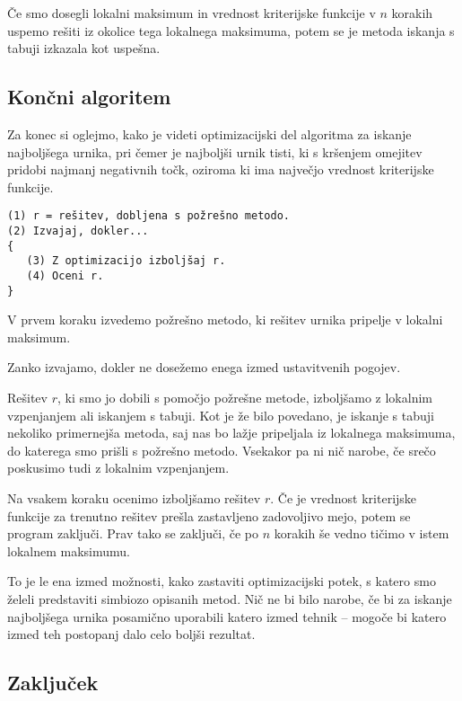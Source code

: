 \documentclass[a4paper, 10pt]{article}
\begin{document}
Če smo dosegli lokalni maksimum in vrednost kriterijske funkcije v $n$ korakih uspemo
rešiti iz okolice tega lokalnega maksimuma, potem se je metoda iskanja s tabuji izkazala
kot uspešna.

\subsection{Končni algoritem}

Za konec si oglejmo, kako je videti optimizacijski del algoritma za iskanje najboljšega
urnika, pri čemer je najboljši urnik tisti, ki s kršenjem omejitev pridobi najmanj negativnih
točk, oziroma ki ima največjo vrednost kriterijske funkcije.

\begin{verbatim}
(1) r = rešitev, dobljena s požrešno metodo.
(2) Izvajaj, dokler...
{
   (3) Z optimizacijo izboljšaj r.
   (4) Oceni r.
}
\end{verbatim}

   V prvem koraku izvedemo požrešno metodo, ki rešitev urnika pripelje v lokalni maksimum.

   Zanko izvajamo, dokler ne dosežemo enega izmed ustavitvenih pogojev.

   Rešitev $r$, ki smo jo dobili s pomočjo požrešne metode, izboljšamo z lokalnim vzpenjanjem
   ali iskanjem s tabuji. Kot je že bilo povedano, je iskanje s tabuji nekoliko primernejša metoda,
   saj nas bo lažje pripeljala iz lokalnega maksimuma, do katerega smo prišli s požrešno metodo.
   Vsekakor pa ni nič narobe, če srečo poskusimo tudi z lokalnim vzpenjanjem.

   Na vsakem koraku ocenimo izboljšamo rešitev $r$. Če je vrednost kriterijske funkcije
   za trenutno rešitev prešla zastavljeno zadovoljivo mejo, potem se program zaključi. Prav tako
   se zaključi, če po $n$ korakih še vedno tičimo v istem lokalnem maksimumu.

To je le ena izmed možnosti, kako zastaviti optimizacijski potek, s katero smo želeli predstaviti
simbiozo opisanih metod. Nič ne bi bilo narobe, če bi za iskanje najboljšega urnika posamično
uporabili katero izmed tehnik -- mogoče bi katero izmed teh postopanj dalo celo boljši rezultat.
%
\subsection{Zaključek}
\end{document}
